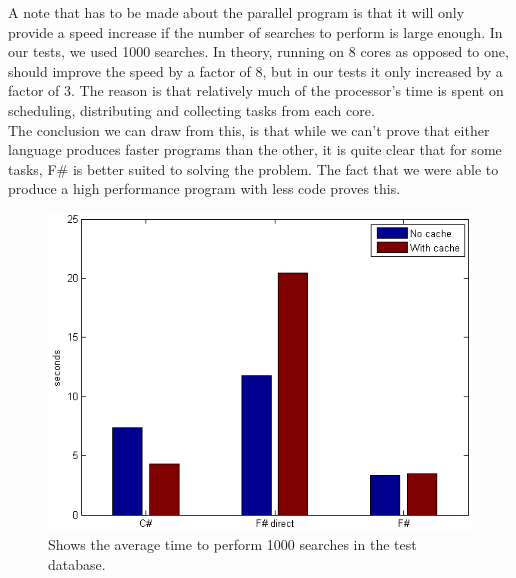 \documentclass[12pt, a4paper]{article}
\begin{document}
A note that has to be made about the parallel program is that it will only provide a speed increase if the number of searches to perform is large enough. In our tests, we used 1000 searches. In theory, running on 8 cores as opposed to one, should improve the speed by a factor of 8, but in our tests it only increased by a factor of 3. The reason is that relatively much of the processor's time is spent on scheduling, distributing and collecting tasks from each core.\\

The conclusion we can draw from this, is that while we can't prove that either language produces faster programs than the other, it is quite clear that for some tasks, F\# is better suited to solving the problem. The fact that we were able to produce a high performance program with less code proves this.

\newpage

\begin{figure}[!h]
    \includegraphics[scale=0.7]{averageChart1}
    \centering
    \caption{Shows the average time to perform 1000 searches in the test database.}
\label{fig:averageChart1}
\end{figure}
\end{document}
